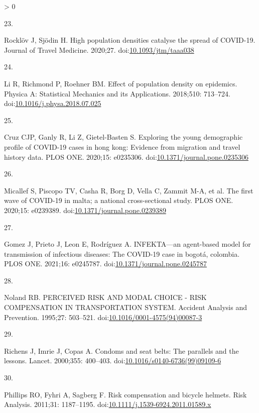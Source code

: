 \documentclass[10pt,letterpaper]{article}
\newlength{\csllabelwidth}
\newlength{\cslhangindent}
\newenvironment{CSLReferences}[3] %
 {%
  \setlength{\parindent}{0pt}
  \ifodd #1 \everypar{\setlength{\hangindent}{\cslhangindent}}\ignorespaces\fi
  \ifnum #2 > 0
  \setlength{\parskip}{#2\baselineskip}
  \fi
 }%
 {}
\newcommand{\CSLLeftMargin}[1]{\parbox[t]{\csllabelwidth}{#1}}
\newcommand{\CSLRightInline}[1]{\parbox[t]{\linewidth - \csllabelwidth}{#1}}
\begin{document}
\begin{CSLReferences}{0}{0}
\leavevmode\hypertarget{ref-Rocklov2020high}{}%
\CSLLeftMargin{23. }
\CSLRightInline{Rocklöv J, Sjödin H. High population densities catalyse
the spread of COVID-19. Journal of Travel Medicine. 2020;27.
doi:\href{https://doi.org/10.1093/jtm/taaa038}{10.1093/jtm/taaa038}}

\leavevmode\hypertarget{ref-Li2018effect}{}%
\CSLLeftMargin{24. }
\CSLRightInline{Li R, Richmond P, Roehner BM. Effect of population
density on epidemics. Physica A: Statistical Mechanics and its
Applications. 2018;510: 713--724.
doi:\href{https://doi.org/10.1016/j.physa.2018.07.025}{10.1016/j.physa.2018.07.025}}

\leavevmode\hypertarget{ref-Cruz2020exploring}{}%
\CSLLeftMargin{25. }
\CSLRightInline{Cruz CJP, Ganly R, Li Z, Gietel-Basten S. Exploring the
young demographic profile of COVID-19 cases in hong kong: Evidence from
migration and travel history data. PLOS ONE. 2020;15: e0235306.
doi:\href{https://doi.org/10.1371/journal.pone.0235306}{10.1371/journal.pone.0235306}}

\leavevmode\hypertarget{ref-Micallef2020first}{}%
\CSLLeftMargin{26. }
\CSLRightInline{Micallef S, Piscopo TV, Casha R, Borg D, Vella C, Zammit
M-A, et al. The first wave of COVID-19 in malta; a national
cross-sectional study. PLOS ONE. 2020;15: e0239389.
doi:\href{https://doi.org/10.1371/journal.pone.0239389}{10.1371/journal.pone.0239389}}

\leavevmode\hypertarget{ref-Gomez2021infekta}{}%
\CSLLeftMargin{27. }
\CSLRightInline{Gomez J, Prieto J, Leon E, Rodríguez A. INFEKTA---an
agent-based model for transmission of infectious diseases: The COVID-19
case in bogotá, colombia. PLOS ONE. 2021;16: e0245787.
doi:\href{https://doi.org/10.1371/journal.pone.0245787}{10.1371/journal.pone.0245787}}

\leavevmode\hypertarget{ref-Noland1995perceived}{}%
\CSLLeftMargin{28. }
\CSLRightInline{Noland RB. PERCEIVED RISK AND MODAL CHOICE - RISK
COMPENSATION IN TRANSPORTATION SYSTEM. Accident Analysis and Prevention.
1995;27: 503--521.
doi:\href{https://doi.org/10.1016/0001-4575(94)00087-3}{10.1016/0001-4575(94)00087-3}}

\leavevmode\hypertarget{ref-Richens2000condoms}{}%
\CSLLeftMargin{29. }
\CSLRightInline{Richens J, Imrie J, Copas A. Condoms and seat belts: The
parallels and the lessons. Lancet. 2000;355: 400--403.
doi:\href{https://doi.org/10.1016/s0140-6736(99)09109-6}{10.1016/s0140-6736(99)09109-6}}

\leavevmode\hypertarget{ref-Phillips2011risk}{}%
\CSLLeftMargin{30. }
\CSLRightInline{Phillips RO, Fyhri A, Sagberg F. Risk compensation and
bicycle helmets. Risk Analysis. 2011;31: 1187--1195.
doi:\href{https://doi.org/10.1111/j.1539-6924.2011.01589.x}{10.1111/j.1539-6924.2011.01589.x}}


\end{CSLReferences}
\end{document}
